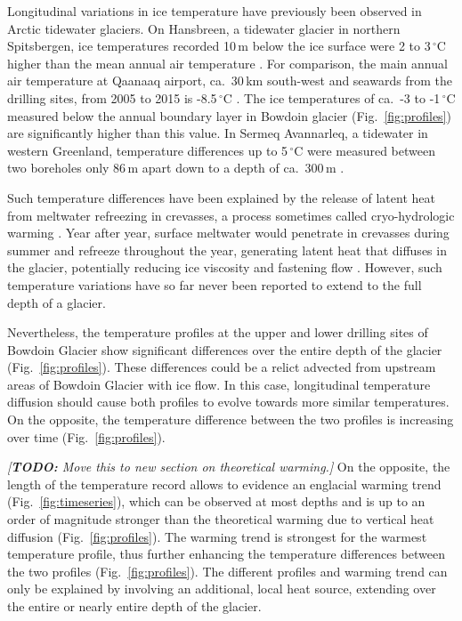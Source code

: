 \documentclass[utf8]{article}
\newcommand{\todo}[1]{\textcolor{c3}{\emph{[\textbf{TODO:} #1]}}}
\begin{document}
    Longitudinal variations in ice temperature have previously been observed in
    Arctic tidewater glaciers. On Hansbreen, a tidewater glacier in northern
    Spitsbergen, ice temperatures recorded 10\,m below the ice surface were 2
    to 3\,$^\circ$C higher than the mean annual air temperature
    \citep{Jania.etal.1996}.
    For comparison, the main annual air temperature at Qaanaaq airport,
    ca.~30\,km south-west and seawards from the drilling sites, from 2005 to
    2015 is -8.5\,$^\circ$C \citep{Sugiyama.etal.2014, Tsutaki.etal.2017}. The
    ice temperatures of ca.~-3 to -1\,$^\circ$C measured below the annual
    boundary layer in Bowdoin glacier (Fig.~\ref{fig:profiles}) are
    significantly higher than this value. In Sermeq Avannarleq, a tidewater in
    western Greenland, temperature differences up to 5\,$^\circ$C were measured
    between two boreholes only 86\,m apart down to a depth of ca.~300\,m
    \citep{Luthi.etal.2015}.

    Such temperature differences have been explained by the release of latent
    heat from meltwater refreezing in crevasses, a process sometimes called
    cryo-hydrologic warming \citep{Phillips.etal.2010}. Year after year,
    surface meltwater would penetrate in crevasses during summer and refreeze
    throughout the year, generating latent heat that diffuses in the
    glacier, potentially reducing ice viscosity and fastening flow
    \citep{Phillips.etal.2013}. However, such temperature variations have so
    far never been reported to extend to the full depth of a glacier.

    Nevertheless, the temperature profiles at the upper and lower drilling
    sites of Bowdoin Glacier show significant differences over the entire depth
    of the glacier (Fig.~\ref{fig:profiles}). These differences could be a
    relict advected from upstream areas
    of Bowdoin Glacier with ice flow. In this case, longitudinal
    temperature diffusion should cause both profiles to evolve towards more
    similar temperatures. On the opposite, the temperature difference between
    the two profiles is increasing over time (Fig.~\ref{fig:profiles}).

    \todo{Move this to new section on theoretical warming.}
    On the opposite, the length of the temperature record allows to evidence an
    englacial warming trend (Fig.~\ref{fig:timeseries}), which can be observed
    at most depths and is up to an order of magnitude stronger than the
    theoretical warming due to vertical heat diffusion
    (Fig.~\ref{fig:profiles}). The warming trend is strongest for the warmest
    temperature profile, thus further enhancing the temperature differences
    between the two profiles (Fig.~\ref{fig:profiles}). The different profiles
    and warming trend can only be explained by involving an additional, local
    heat source, extending over the entire or nearly entire depth of the
    glacier.
\end{document}
